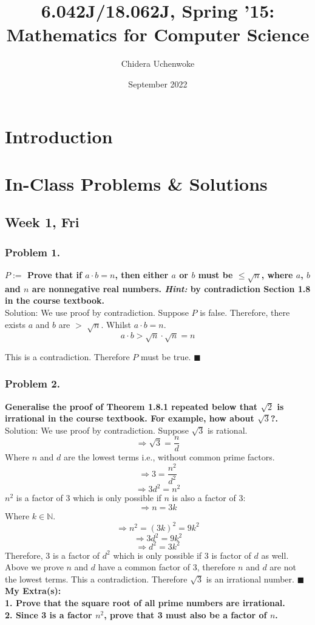 \documentclass{article}
\title{6.042J/18.062J, Spring '15: Mathematics for Computer Science}
\author{Chidera Uchenwoke}
\date{September 2022}
\begin{document}
\maketitle
\tableofcontents

\section{Introduction}

\section{In-Class Problems \& Solutions}
\subsection{Week 1, Fri}

\subsubsection{Problem 1.}
\textbf{\(P := \) Prove that if $a \cdot b = n $, then either $a$ or $b$ must be $\leq \sqrt{n}$, where $a$, $b$ and $n$ are nonnegative real numbers. \textit{Hint:} by contradiction Section 1.8 in the course textbook.}
\\[5pt]
Solution: We use proof by contradiction. Suppose \(P\) is false. Therefore, there exists \(a\) and \(b\) are \(>\) \(\sqrt{n}\). Whilst $a \cdot b = n$.
\[a \cdot b > \sqrt{n} \cdot \sqrt{n} = n\]

\noindent This is a contradiction. Therefore \(P\) must be true.
$ \blacksquare $

\subsubsection{Problem 2.}
\textbf{Generalise the proof of Theorem 1.8.1 repeated below that $\sqrt{2}$ is irrational in the course textbook. For example, how about $\sqrt{3}$?.}
\\[5pt]
Solution: We use proof by contradiction. Suppose \(\sqrt{3}\) is rational. 
\[\Rightarrow \sqrt{3} = \frac{n}{d}\]
Where \(n\) and \(d\) are the lowest terms i.e., without common prime factors.
\[\Rightarrow 3 = \frac{n^2}{d^2}\]
\[\Rightarrow 3d^2 = n^2 \]
\(n^2\) is a factor of 3 which is only possible if \(n\) is also a factor of 3:
\[\Rightarrow n = 3k\]
Where \(k \in \mathbb{N}\).
\[\Rightarrow n^2 = (3k)^2 = 9k^2\]
\[\Rightarrow 3d^2 = 9k^2\]
\[\Rightarrow d^2 = 3k^2\]
Therefore, 3 is a factor of \(d^2\) which is only possible if 3 is factor of \(d\) as well.
\\[5pt]
Above we prove \(n\) and \(d\) have a common factor of 3, therefore \(n\) and \(d\) are not the lowest terms. This a contradiction. Therefore $\sqrt{3}$ is an irrational number.
$\blacksquare$
\\[5pt]
\noindent
\textbf{My Extra(s):\\
1. Prove that the square root of all prime numbers are irrational.\\
2. Since 3 is a factor $n^{2}$, prove that 3 must also be a factor of $n$.}
\end{document}
